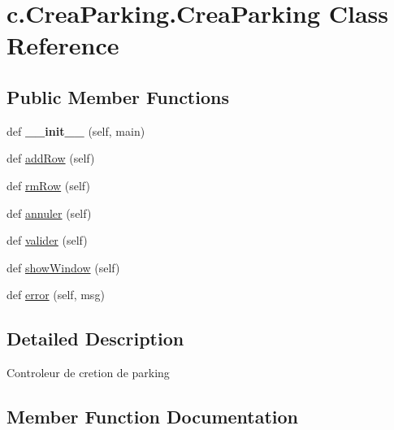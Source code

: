 \hypertarget{classc_1_1_crea_parking_1_1_crea_parking}{}\section{c.\+Crea\+Parking.\+Crea\+Parking Class Reference}
\label{classc_1_1_crea_parking_1_1_crea_parking}
\subsection*{Public Member Functions}
\begin{DoxyCompactItemize}
\item 
\hypertarget{classc_1_1_crea_parking_1_1_crea_parking_a11f02d7eb087175669bc79f55388c66e}{}def {\bfseries \+\_\+\+\_\+init\+\_\+\+\_\+} (self, main)\label{classc_1_1_crea_parking_1_1_crea_parking_a11f02d7eb087175669bc79f55388c66e}

\item 
def \hyperlink{classc_1_1_crea_parking_1_1_crea_parking_a94442787a0c5558e15e1037c62fbe0b4}{add\+Row} (self)
\item 
def \hyperlink{classc_1_1_crea_parking_1_1_crea_parking_a8ab92eb2421e405cf97e1cb43b565bd4}{rm\+Row} (self)
\item 
def \hyperlink{classc_1_1_crea_parking_1_1_crea_parking_ac5f4611533e2f8884f15fc5352d35910}{annuler} (self)
\item 
def \hyperlink{classc_1_1_crea_parking_1_1_crea_parking_a883508e38ec573968509b1d283c42d70}{valider} (self)
\item 
def \hyperlink{classc_1_1_crea_parking_1_1_crea_parking_a3882e04b5c75c1a2b367129167847001}{show\+Window} (self)
\item 
def \hyperlink{classc_1_1_crea_parking_1_1_crea_parking_a5e0d4a3afdf5c8d94fcc14afe4195387}{error} (self, msg)
\end{DoxyCompactItemize}


\subsection{Detailed Description}
\begin{DoxyVerb}Controleur de cretion de parking
\end{DoxyVerb}
 

\subsection{Member Function Documentation}
\hypertarget{classc_1_1_crea_parking_1_1_crea_parking_a94442787a0c5558e15e1037c62fbe0b4}{}
